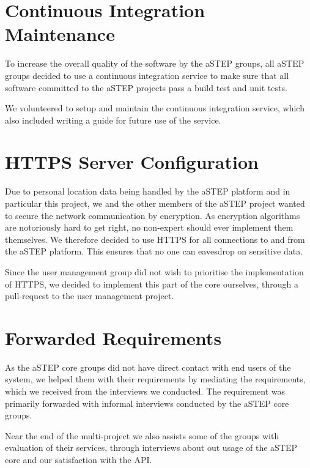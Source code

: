 \section{Continuous Integration Maintenance}
To increase the overall quality of the software by the aSTEP groups, all aSTEP groups decided to use a continuous integration service to make sure that all software committed to the aSTEP projects pass a build test and unit tests.

We volunteered to setup and maintain the continuous integration service, which also included writing a guide for future use of the service.

\section{HTTPS Server Configuration}
Due to personal location data being handled by the aSTEP platform and in particular this project, we and the other members of the aSTEP project wanted to secure the network communication by encryption. As encryption algorithms are notoriously hard to get right, no non-expert should ever implement them themselves. We therefore decided to use HTTPS for all connections to and from the aSTEP platform. This ensures that no one can eavesdrop on sensitive data.

Since the user management group did not wish to prioritise the implementation of HTTPS, we decided to implement this part of the core ourselves, through a pull-request to the user management project.

\section{Forwarded Requirements}

As the aSTEP core groups did not have direct contact with end users of the system, we helped them with their requirements by mediating the requirements, which we received from the interviews we conducted. The requirement was primarily forwarded with informal interviews conducted by the aSTEP core groups.

Near the end of the multi-project we also assists some of the groups with evaluation of their services, through interviews about out usage of the aSTEP core and our satisfaction with the API.








